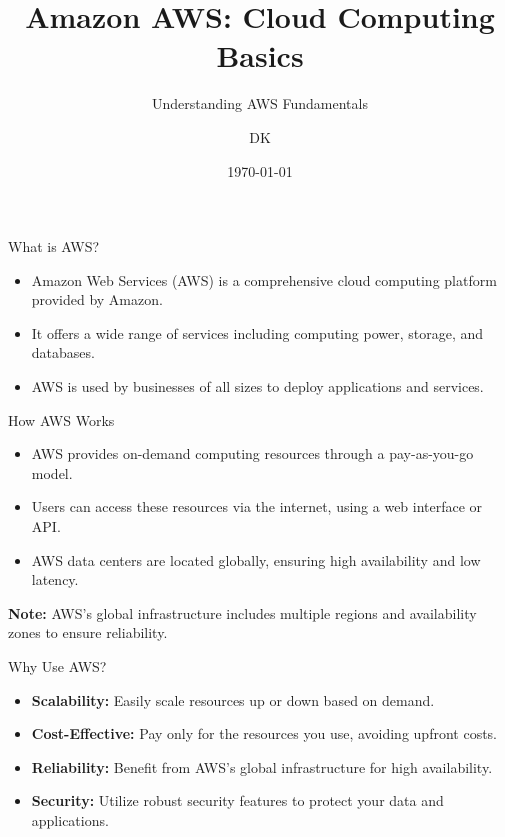 \documentclass{beamer}
\title{Amazon AWS: Cloud Computing Basics}
\subtitle{Understanding AWS Fundamentals}
\author{DK}
\institute{Ramakrishna Mission Vivekananda Centenary College}
\date{\today}
\begin{document}
\begin{frame}
    \titlepage
\end{frame}

\begin{frame}{What is AWS?}
    \begin{itemize}
        \item Amazon Web Services (AWS) is a comprehensive cloud computing platform provided by Amazon.
        \item It offers a wide range of services including computing power, storage, and databases.
        \item AWS is used by businesses of all sizes to deploy applications and services.
    \end{itemize}
\end{frame}

\begin{frame}{How AWS Works}
    \begin{itemize}
        \item AWS provides on-demand computing resources through a pay-as-you-go model.
        \item Users can access these resources via the internet, using a web interface or API.
        \item AWS data centers are located globally, ensuring high availability and low latency.
    \end{itemize}
    \pause
    \begin{tcolorbox}[colback=white, colframe=awsblue, sharp corners=south, boxrule=0.8mm]
    \textbf{Note:} AWS's global infrastructure includes multiple regions and availability zones to ensure reliability.
    \end{tcolorbox}
\end{frame}

\begin{frame}{Why Use AWS?}
    \begin{multicols}{2}
        \begin{itemize}
            \item \textbf{Scalability:} Easily scale resources up or down based on demand.
            \item \textbf{Cost-Effective:} Pay only for the resources you use, avoiding upfront costs.
        \end{itemize}
        \columnbreak
        \begin{itemize}
            \item \textbf{Reliability:} Benefit from AWS’s global infrastructure for high availability.
            \item \textbf{Security:} Utilize robust security features to protect your data and applications.
        \end{itemize}
    \end{multicols}
\end{frame}
\end{document}
